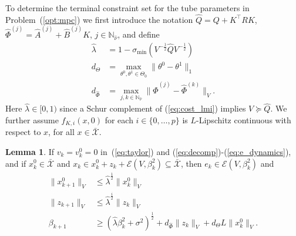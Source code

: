 \documentclass{IEEEtran}
\theoremstyle{definition}
\newtheorem{lemma}{Lemma}
\theoremstyle{remark}
\begin{document}
To determine the terminal constraint set for the tube parameters in Problem~(\ref{opt:mpc}) we first introduce the notation $\hat{Q} = Q+K^\top R K$, $\hat{\Phi}^{(j)} = \hat{A}^{(j)}+\hat{B}^{(j)}K$, $j\in\mathbb{N}_{\hat{\nu}}$, and define
\begin{align}
\hat{\lambda} &= 1 - \sigma_{\min} ( V^{-\frac{1}{2}} \hat{Q} V^{-\frac{1}{2}} )
\label{eq:lambda_term}
\\
d_\Theta &= \max_{\theta^0,\theta^1 \in\Theta_0} \| \theta^0 - \theta^1 \|_1
\label{eq:Theta_diam}
\\
d_{\hat{\Phi}} &= \max_{j,k\in\mathbb{N}_{\hat{\nu}}} \|
\hat{\Phi}^{(j)} - \hat{\Phi}^{(k)}\|_V .
\label{eq:Phi_diam}
\end{align}%
Here $\hat{\lambda}\in [0,1)$ since a Schur complement of (\ref{eq:cost_lmi}) implies $V\succeq \hat{Q}$.
We further assume $f_{K,i}(x,0)$ for each $i\in\{0,\ldots,p\}$ is $L$-Lipschitz continuous with respect to $x$, for all $x\in\bar{\mathcal{X}}$. 

\begin{lemma}\label{lem:term_tube}
If $v_k=v^0_k=0$
in~(\ref{eq:taylor}) and (\ref{eq:decomp})-(\ref{eq:e_dynamics}), and if 
$x^0_k\in\bar{\mathcal{X}}$ and $x_k \in x^0_k+z_k+\mathcal{E}(V,\beta_k^2)\subseteq\bar{\mathcal{X}}$,
then $e_k \in \mathcal{E}(V,\beta_k^2)$ and
\begin{align}
\|x^0_{k+1}\|_V &\leq \hat{\lambda}^{\frac{1}{2}} \|x^0_k\|_V 
\label{eq:x0_term_bound}
\\
\|z_{k+1}\|_V &\leq \hat{\lambda}^{\frac{i}{2}} \|z_k\|_V 
\label{eq:z_term_bound}
\\
\beta_{k+1} &\geq (\hat{\lambda} \beta_{k}^2 +\sigma^2)^\frac{1}{2} + d_{\hat{\Phi}} \|z_{k}\|_V + 
d_\Theta L \|x_k^0\|_V .
\label{eq:beta_term_bound}
\end{align}
\end{lemma}
\end{document}
